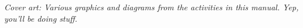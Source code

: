 \vfill


\textit{Cover art: Various graphics and diagrams from the activities in this manual.  Yep, you'll be doing stuff.}

\pagebreak
